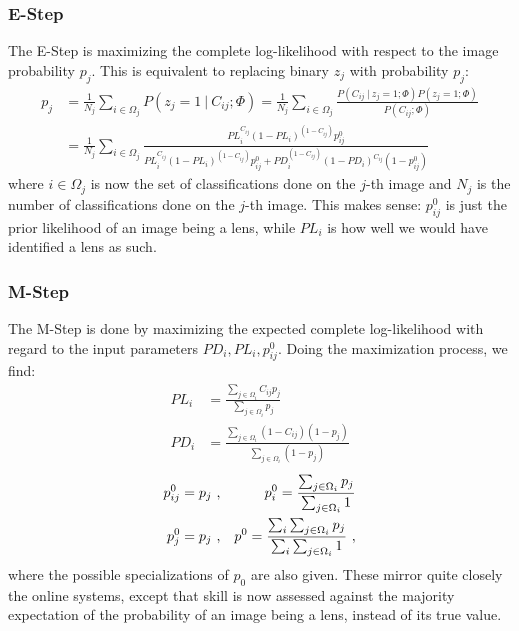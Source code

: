 \documentclass[useAMS,usenatbib,a4paper]{mn2e}
\begin{document}
\subsubsection{E-Step}
\label{sec:formalism:em:estep}
The E-Step is maximizing the complete log-likelihood with respect to the image
probability $p_j$.  This is equivalent to replacing binary $z_j$ with
probability $p_j$:
\begin{align}
  p_j &= \frac{1}{N_j} \sum_{i \in \Omega_j} P(z_j = 1 \ | \ C_{ij} ; \Phi) =
  \frac{1}{N_j} \sum_{i \in \Omega_j} \frac{ P(C_{ij} \ | \ z_j = 1; \Phi)
P(z_j = 1 ; \Phi)}{P(C_{ij} ; \Phi)} \\
&= \frac{1}{N_j} \sum_{i \in \Omega_j} \frac{ PL_{i}^{C_{ij}} (1 - PL_{i})^{(1 -
C_{ij})} p_{ij}^{0}}{ PL_{i}^{C_{ij}} (1 -
  PL_{i})^{(1 - C_{ij})} p_{ij}^{0} + PD_{i}^{(1 - C_{ij})} (1 -
PD_{i})^{C_{ij}} (1 - p_{ij}^{0})}
\end{align}
where $i \in \Omega_j$ is now the set of classifications done on the $j$-th
image and $N_j$ is the number of classifications done on the $j$-th image. This
makes sense: $p_{ij}^{0}$ is just the prior likelihood of an image being a lens,
while $PL_{i}$ is how well we would have identified a lens as such.


\subsubsection{M-Step}
\label{sec:formalism:em:mstep}
The M-Step is done by maximizing the expected complete log-likelihood with
regard to the input parameters $PD_{i}, PL_{i}, p_{ij}^{0}$. Doing the
maximization process, we find:
\begin{align}
  PL_{i} &= \frac{\sum_{j \in \Omega_i} C_{ij} p_{j}}{\sum_{j \in
\Omega_i} p_{j}} \\
  PD_{i} &= \frac{\sum_{j \in \Omega_i} (1 - C_{ij}) (1 - p_{j})}{\sum_{j \in
\Omega_i} (1 - p_{j})}
\end{align}
\begin{align}
  p_{ij}^{0} &= p_{j} \ , &p_{i}^{0} = \frac{\sum_{j \in \Omega_i}
p_{j}}{\sum_{j \in \Omega_i} 1} \notag\\
   p_{j}^{0} &= p_{j} \ , &p^{0} = \frac{\sum_i \sum_{j \in \Omega_i}
p_{j}}{\sum_i \sum_{j \in
  \Omega_i} 1} \ ,
\end{align}
where the possible specializations of $p_0$ are also given. These mirror quite
closely the online systems, except that skill is now assessed against
the majority expectation of the probability of an image being a lens, instead
of its true value.
\end{document}

